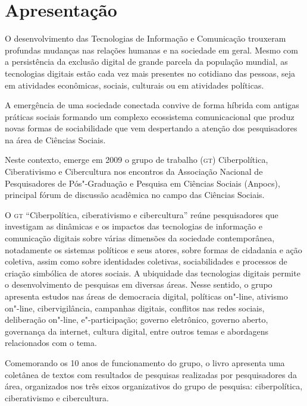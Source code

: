 \chapter*{Apresentação}

O desenvolvimento das Tecnologias de Informação e Comunicação trouxeram
profundas mudanças nas relações humanas e na sociedade em geral. Mesmo
com a persistência da exclusão digital de grande parcela da população
mundial, as tecnologias digitais estão cada vez mais presentes no
cotidiano das pessoas, seja em atividades econômicas, sociais, culturais
ou em atividades políticas.

A emergência de uma sociedade conectada convive de forma híbrida com
antigas práticas sociais formando um complexo ecossistema comunicacional
que produz novas formas de sociabilidade que vem despertando a atenção
dos pesquisadores na área de Ciências Sociais.

Neste contexto, emerge em 2009 o grupo de trabalho (\textsc{gt}) Ciberpolítica,
Ciberativismo e Cibercultura nos encontros da Associação Nacional de
Pesquisadores de Pós"-Graduação e Pesquisa em Ciências Sociais (Anpocs),
principal fórum de discussão acadêmica no campo das Ciências Sociais.

O \textsc{gt} ``Ciberpolítica, ciberativismo e cibercultura'' reúne pesquisadores
que investigam as dinâmicas e os impactos das tecnologias de informação
e comunicação digitais sobre várias dimensões da sociedade
contemporânea, notadamente os sistemas políticos e seus atores, sobre
formas de cidadania e ação coletiva, assim como sobre identidades
coletivas, sociabilidades e processos de criação simbólica de atores
sociais. A ubiquidade das tecnologias digitais permite o desenvolvimento
de pesquisas em diversas áreas. Nesse sentido, o grupo apresenta estudos
nas áreas de democracia digital, políticas on"-line, ativismo on"-line,
cibervigilância, campanhas digitais, conflitos nas redes sociais,
deliberação on"-line, e"-participação; governo eletrônico, governo aberto,
governança da internet, cultura digital, entre outros temas e abordagens
relacionados com o tema.

Comemorando os 10 anos de funcionamento do grupo, o livro apresenta uma
coletânea de textos com resultados de pesquisas realizadas por
pesquisadores da área, organizados nos três eixos organizativos do grupo
de pesquisa: ciberpolítica, ciberativismo e cibercultura.

